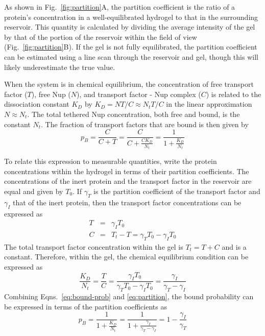 As shown in Fig.~\ref{fig:partition}A, the partition coefficient is the ratio of a protein's concentration in a well-equilibrated hydrogel to that in the surrounding reservoir.  This quantity is calculated by dividing the average intensity of the gel by that of the portion of the reservoir within the field of view (Fig.~\ref{fig:partition}B).  If the gel is not fully equilibrated, the partition coefficient can be estimated using a line scan through the reservoir and gel, though this will likely underestimate the true value.

When the system is in chemical equilibrium, the concentration of free transport factor ($T$), free Nup ($N$), and transport factor - Nup complex ($C$) is related to the dissociation constant $K_D$ by
$K_D = NT/C \approx N_tT/C$ in the linear approximation $N \approx N_t$.   The total tethered Nup concentration, both free and bound, is the constant $N_t$.  The fraction of transport factors that are bound is then given by
\begin{equation}
p_B = \frac{C}{C+T} = \frac{C}{C+\frac{CK_D}{N_t}} = \frac{1}{1+\frac{K_D}{N_t}} %
\label{eq:bound-prob}
\end{equation} %

To relate this expression to measurable quantities, write the protein concentrations within the hydrogel in terms of their partition coefficients. The concentrations of the inert protein and the transport factor in the reservoir are equal and given by $T_0$.  If $\gamma_T$ is the partition coefficient of the transport factor and $\gamma_I$ that of the inert protein, then the transport factor concentrations can be expressed as
\begin{eqnarray}
T &=& \gamma_I T_0\\
C & =& T_t - T = \gamma_TT_0 - \gamma_I T_0
\label{eq:gamma}
\end{eqnarray} 
The total transport factor concentration within the gel is $T_t = T + C$ and is a constant.
Therefore, within the gel, the chemical equilibrium condition can be expressed as
\begin{equation}
\frac{K_D}{N_t} = \frac{T}{C} = \frac{\gamma_I T_0}{\gamma_T T_0 - \gamma_I T_0} = \frac{\gamma_I}{\gamma_T - \gamma_I}
\label{eq:partition}
\end{equation}
Combining Eqns.~\ref{eq:bound-prob} and \ref{eq:partition}, the bound probability can be expressed in terms of the partition coefficients as
\begin{equation}
p_B= \frac{1}{1+\frac{K_D}{N_t}} = \frac{1}{1+\frac{\gamma_I}{\gamma_T - \gamma_I}} = 1 - \frac{\gamma_I}{\gamma_T}
\label{eq:bound-prob-final}
\end{equation}

